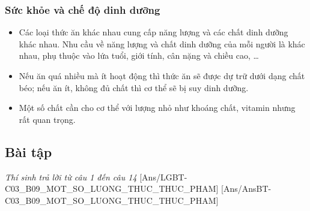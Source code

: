 \documentclass[Main.tex]{subfiles}
\begin{document}
\begin{kienthuccannho}
	\subsubsection{Sức khỏe và chế độ dinh dưỡng}
	\begin{itemize}
		\item Các loại thức ăn khác nhau cung cấp năng lượng và các chất dinh dưỡng khác nhau. Nhu cầu về năng lượng và chất dinh dưỡng của mỗi người là khác nhau, phụ thuộc vào lứa tuổi, giới tính, cân nặng và chiều cao, …
		\item Nếu ăn quá nhiều mà ít hoạt động thì thức ăn sẽ được dự trữ dưới dạng chất béo; nếu ăn ít, không đủ chất thì cơ thể sẽ bị suy dinh dưỡng.
		\item Một số chất cần cho cơ thể với lượng nhỏ như khoáng chất, vitamin nhưng rất quan trọng.
	\end{itemize}
\end{kienthuccannho}
\subsection{Bài tập}

\textit{\large Thí sinh trả lời từ câu 1 đến câu 14}
[Ans/LGBT-C03_B09_MOT_SO_LUONG_THUC_THUC_PHAM]
[Ans/AnsBT-C03_B09_MOT_SO_LUONG_THUC_THUC_PHAM]
\end{document}
